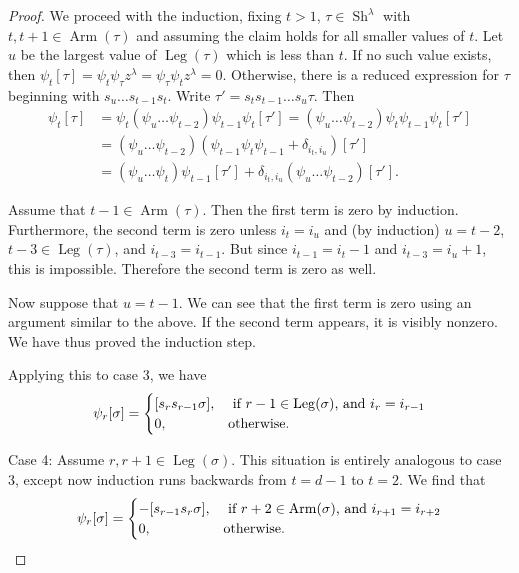 \documentclass[twoside,11pt,reqno,letter]{amsart}
\numberwithin{equation}{section}
\theoremstyle{definition}  %
\newcommand{\Arm}{\operatorname{Arm}}
\newcommand{\Leg}{\operatorname{Leg}}
\newcommand{\Sh}{\operatorname{Sh}}
\newcommand{\0}{{\bar 0}}
\newcommand{\1}{{\bar 1}}
\newcommand{\la}{\lambda}
\newcommand{\si}{\sigma}
\newcommand{\de}{\delta}
\begin{document}
{\begin{proof}
    We proceed with the induction, fixing $t > 1$, $\tau \in \Sh^\la$ with $t, t+1 \in \Arm(\tau)$ and assuming the claim holds for all smaller values of $t$. Let $u$ be the largest value of $\Leg(\tau)$ which is less than $t$. If no such value exists, then $\psi_t [\tau] = \psi_t \psi_\tau z^\la = \psi_\tau \psi_t z^\la = 0$. Otherwise, there is a reduced expression for $\tau$ beginning with $s_u \dots s_{t-1} s_t$. Write $\tau' = s_t s_{t-1} \dots s_u \tau$. Then
    \begin{align*}
      \psi_t [\tau] &= \psi_t (\psi_u \dots \psi_{t-2}) \psi_{t-1} \psi_t [\tau'] = (\psi_u \dots \psi_{t-2}) \psi_t \psi_{t-1} \psi_t [\tau'] \\
        &= (\psi_u \dots \psi_{t-2})(\psi_{t-1} \psi_t \psi_{t-1} + \de_{i_t, i_u}) [\tau']\\
        &= (\psi_u \dots \psi_t) \psi_{t-1} [\tau'] + \de_{i_t, i_u} (\psi_u \dots \psi_{t-2}) [\tau'].
    \end{align*}

    Assume that $t-1 \in \Arm(\tau)$. Then the first term is zero by induction. Furthermore, the second term is zero unless $i_t = i_u$ and (by induction) $u=t-2$, $t-3 \in \Leg(\tau)$, and $i_{t-3} = i_{t-1}$. But since $i_{t-1} = i_t - 1$ and $i_{t-3} = i_u + 1$, this is impossible. Therefore the second term is zero as well.

    Now suppose that $u = t-1$. We can see that the first term is zero using an argument similar to the above. If the second term appears, it is visibly nonzero. We have thus proved the induction step.
    
    Applying this to case 3, we have
    $$\psi_r [\si] = \begin{cases}[s_r s_{r-1} \si],& \textup{ if $r-1 \in \Leg(\si)$, and $i_r = i_{r-1}$}\\
     0,& \text{otherwise.} \end{cases}$$
 

    Case 4: Assume $r, r+1 \in \Leg(\si)$. This situation is entirely analogous to case 3, except now induction runs backwards from $t = d-1$ to $t = 2$. We find that
    $$\psi_r [\si] = \begin{cases}-[s_{r-1} s_r \si],& \textup{ if $r+2 \in \Arm(\si)$, and $i_{r+1} = i_{r+2}$}\\
     0,& \text{otherwise.} \end{cases}$$

\end{proof}






}
\end{document}
